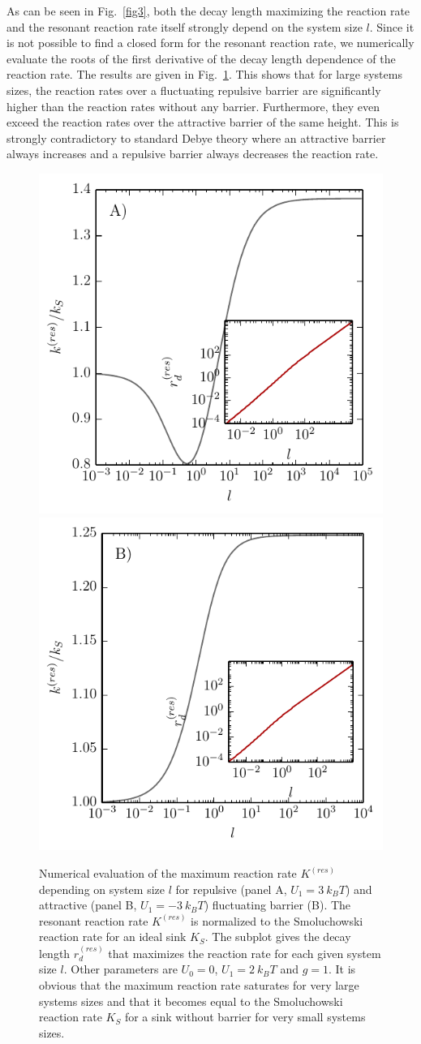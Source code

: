 \documentclass[preprint,superscriptaddress]{revtex4-1}
\begin{document}
As can be seen in Fig.~\ref{fig3}, both the decay length maximizing the reaction rate and the resonant reaction rate itself strongly depend on the system size $l$. Since it is not possible to find a closed form for the resonant reaction rate, we numerically evaluate the roots of the first derivative of the decay length dependence of the reaction  rate. The results are given in Fig.~\ref{fig4}. This shows that for large systems sizes, the reaction rates over a fluctuating repulsive barrier are significantly higher than the reaction rates without any barrier. Furthermore, they even exceed the reaction rates over the attractive barrier of the same height. This is strongly contradictory to standard Debye theory where an attractive barrier always increases and a repulsive barrier always decreases the reaction rate.

    \begin{figure}[H]
    \begin{center}
        \includegraphics[width = .4 \textwidth]{plots/l_rep_power.pdf}
        \includegraphics[width = .4 \textwidth]{plots/l_att_power.pdf}
        \caption{Numerical evaluation of the maximum reaction rate $K^{(res)}$ depending on system size $l$ for repulsive (panel A, $U_1 = 3 ~k_B T$) and attractive (panel B, $U_1 = -3 ~k_B T$) fluctuating barrier (B). The resonant reaction rate $K^{(res)}$ is normalized to the Smoluchowski reaction rate for an ideal sink $K_S$. The subplot gives the decay length $r_{d}^{(res)}$ that maximizes the reaction rate for each given system size $l$. Other parameters are $U_0=0$, $U_1=2~k_B T$ and $g=1$.  It is obvious that the maximum reaction rate saturates for very large systems sizes and that it becomes equal to the Smoluchowski reaction rate $K_S$ for a sink without barrier for very small systems sizes. \label{fig4}}
        \end{center}
    \end{figure}
\end{document}
